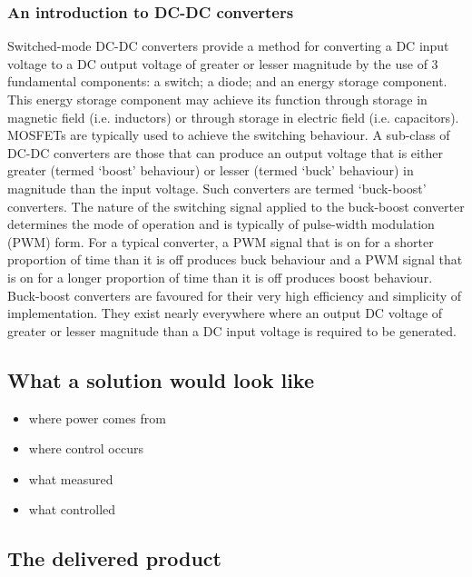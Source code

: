 \subsubsection{An introduction to DC-DC converters}
Switched-mode DC-DC converters provide a method for converting a DC input voltage to a DC output voltage of greater or lesser magnitude by the use of 3 fundamental components: a switch; a diode; and an energy storage component. This energy storage component may achieve its function through storage in magnetic field (i.e. inductors) or through storage in electric field (i.e. capacitors). MOSFETs are typically used to achieve the switching behaviour.
\newpar
A sub-class of DC-DC converters are those that can produce an output voltage that is either greater (termed `boost' behaviour) or lesser (termed `buck' behaviour) in magnitude than the input voltage. Such converters are termed `buck-boost' converters. The nature of the switching signal applied to the buck-boost converter determines the mode of operation and is typically of pulse-width modulation (PWM) form. For a typical converter, a PWM signal that is on for a shorter proportion of time than it is off produces buck behaviour and a PWM signal that is on for a longer proportion of time than it is off produces boost behaviour.
\newpar
Buck-boost converters are favoured for their very high efficiency and simplicity of implementation. They exist nearly everywhere where an output DC voltage of greater or lesser magnitude than a DC input voltage is required to be generated.
\subsection{What a solution would look like}\label{sec:solution}
\begin{itemize}
    \item where power comes from
    \item where control occurs
    \item what measured
    \item what controlled
\end{itemize}
\subsection{The delivered product}
